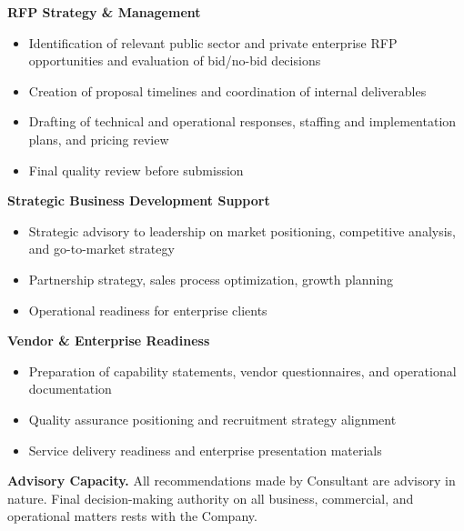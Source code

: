 \documentclass{toospoint}
\begin{document}
\vspace{4pt}
\noindent\textbf{\color{TPDark}RFP Strategy \& Management}
\begin{itemize}[leftmargin=1.5em, itemsep=2pt, topsep=2pt]
  \item Identification of relevant public sector and private enterprise RFP opportunities and evaluation of bid/no-bid decisions
  \item Creation of proposal timelines and coordination of internal deliverables
  \item Drafting of technical and operational responses, staffing and implementation plans, and pricing review
  \item Final quality review before submission
\end{itemize}

\vspace{4pt}
\noindent\textbf{\color{TPDark}Strategic Business Development Support}
\begin{itemize}[leftmargin=1.5em, itemsep=2pt, topsep=2pt]
  \item Strategic advisory to leadership on market positioning, competitive analysis, and go-to-market strategy
  \item Partnership strategy, sales process optimization, growth planning
  \item Operational readiness for enterprise clients
\end{itemize}

\vspace{4pt}
\noindent\textbf{\color{TPDark}Vendor \& Enterprise Readiness}
\begin{itemize}[leftmargin=1.5em, itemsep=2pt, topsep=2pt]
  \item Preparation of capability statements, vendor questionnaires, and operational documentation
  \item Quality assurance positioning and recruitment strategy alignment
  \item Service delivery readiness and enterprise presentation materials
\end{itemize}

\begin{clausebox}
\sffamily\footnotesize\color{TPGray}
\textbf{Advisory Capacity.} All recommendations made by Consultant are advisory
in nature. Final decision-making authority on all business, commercial, and
operational matters rests with the Company.
\end{clausebox}

\end{document}
